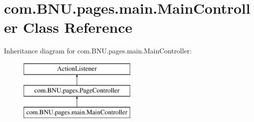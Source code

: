 \hypertarget{classcom_1_1_b_n_u_1_1pages_1_1main_1_1_main_controller}{}\section{com.\+B\+N\+U.\+pages.\+main.\+Main\+Controller Class Reference}
\label{classcom_1_1_b_n_u_1_1pages_1_1main_1_1_main_controller}
Inheritance diagram for com.\+B\+N\+U.\+pages.\+main.\+Main\+Controller\+:\begin{figure}[H]
\begin{center}
\leavevmode
\includegraphics[height=3.000000cm]{classcom_1_1_b_n_u_1_1pages_1_1main_1_1_main_controller}
\end{center}
\end{figure}
